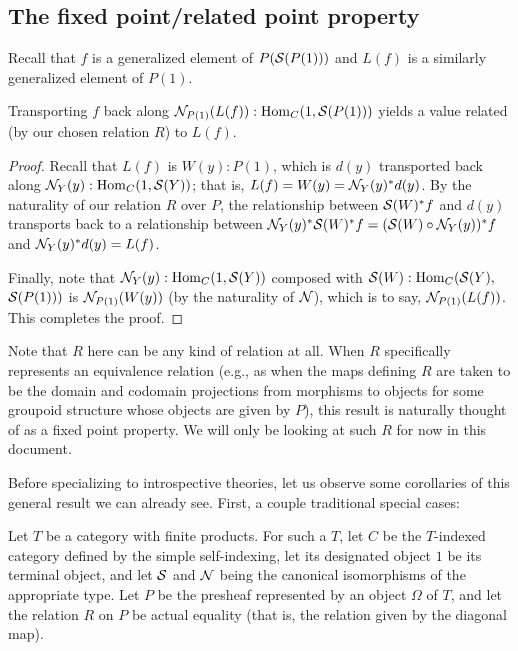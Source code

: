 \subsection{The fixed point/related point property}
Recall that $f$ is a generalized element of $P(\mathcal{S}(P(1)))$ and $L(f)$ is a similarly generalized element of $P(1)$.
\begin{theorem}\label{GeneralDiagThm}
Transporting $f$ back along $\mathcal{N}_{P(1)}(L(f)) : \operatorname{Hom}_C(1, \mathcal{S}(P(1)))$ yields a value related (by our chosen relation $R$) to $L(f)$.
\end{theorem}
\begin{proof}
Recall that $L(f)$ is $W(y) : P(1)$, which is $d(y)$ transported back along $\mathcal{N}_Y(y) : \operatorname{Hom}_C(1, \mathcal{S}(Y))$; that is, $L(f) = W(y) = \mathcal{N}_Y(y)^* d(y)$. By the naturality of our relation $R$ over $P$, the relationship between $\mathcal{S}(W)^*f$ and $d(y)$ transports back to a relationship between $\mathcal{N}_Y(y)^* \mathcal{S}(W)^*f = (\mathcal{S}(W) \circ \mathcal{N}_Y(y))^* f$ and $\mathcal{N}_Y(y)^* d(y) = L(f)$.

Finally, note that $\mathcal{N}_Y(y) : \operatorname{Hom}_C(1, \mathcal{S}(Y))$ composed with $\mathcal{S}(W) : \operatorname{Hom}_C(\mathcal{S}(Y),$ $ \mathcal{S}(P(1)))$ is $\mathcal{N}_{P(1)}(W(y))$ (by the naturality of $\mathcal{N}$), which is to say, $\mathcal{N}_{P(1)}(L(f))$. This completes the proof.
\end{proof}

Note that $R$ here can be any kind of relation at all. When $R$ specifically represents an equivalence relation (e.g., as when the maps defining $R$ are taken to be the domain and codomain projections from morphisms to objects for some groupoid structure whose objects are given by $P$), this result is naturally thought of as a fixed point property. We will only be looking at such $R$ for now in this document.

Before specializing to introspective theories, let us observe some corollaries of this general result we can already see. First, a couple traditional special cases:

\label{LawveresTheorem}
Let $T$ be a category with finite products. For such a $T$, let $C$ be the $T$-indexed category defined by the simple self-indexing, let its designated object $1$ be its terminal object, and let $\mathcal{S}$ and $\mathcal{N}$ being the canonical isomorphisms of the appropriate type. Let $P$ be the presheaf represented by an object $\Omega$ of $T$, and let the relation $R$ on $P$ be actual equality (that is, the relation given by the diagonal map). 

